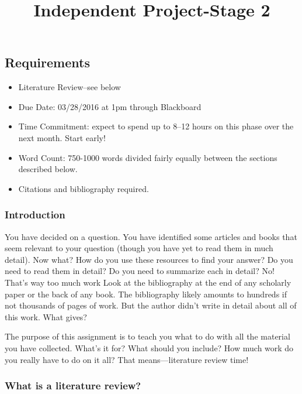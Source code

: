 \documentclass[]{article}
\title{Independent Project-Stage 2}
\date{}
\begin{document}
\maketitle

\subsection{Requirements}\label{independent-project-stage-2}

\begin{itemize}
\itemsep1pt\parskip0pt
\item
  Literature Review--see below
\item
  Due Date: 03/28/2016 at 1pm through Blackboard
\item Time Commitment: expect to spend up to 8--12 hours on this phase over the next month. Start early!
\item
  Word Count: 750-1000 words divided fairly equally between the sections
  described below.
\item
  Citations and bibliography required.
\end{itemize}

\subsubsection{Introduction}\label{introduction}

You have decided on a question. You have identified some articles and
books that seem relevant to your question (though you have yet to read
them in much detail). Now what? How do you use these resources to find
your answer? Do you need to read them in detail? Do you need to
summarize each in detail? No! That's way too much work Look at the
bibliography at the end of any scholarly paper or the back of any book.
The bibliography likely amounts to hundreds if not thousands of pages of
work. But the author didn't write in detail about all of this work. What
gives?

The purpose of this assignment is to teach you what to do with all the
material you have collected. What's it for? What should you include? How
much work do you really have to do on it all? That means---literature
review time!

\subsubsection{What is a literature
review?}\label{what-is-a-literature-review}
\end{document}

